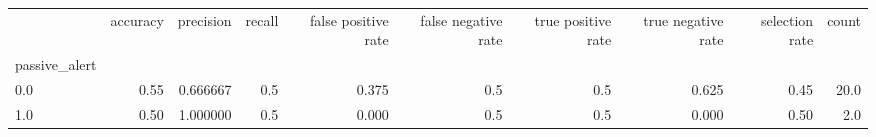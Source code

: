 \begin{tabular}{lrrrrrrrrr}
\toprule
{} &  accuracy &  precision &  recall &  false positive rate &  false negative rate &  true positive rate &  true negative rate &  selection rate &  count \\
passive\_alert &           &            &         &                      &                      &                     &                     &                 &        \\
\midrule
0.0           &      0.55 &   0.666667 &     0.5 &                0.375 &                  0.5 &                 0.5 &               0.625 &            0.45 &   20.0 \\
1.0           &      0.50 &   1.000000 &     0.5 &                0.000 &                  0.5 &                 0.5 &               0.000 &            0.50 &    2.0 \\
\bottomrule
\end{tabular}
